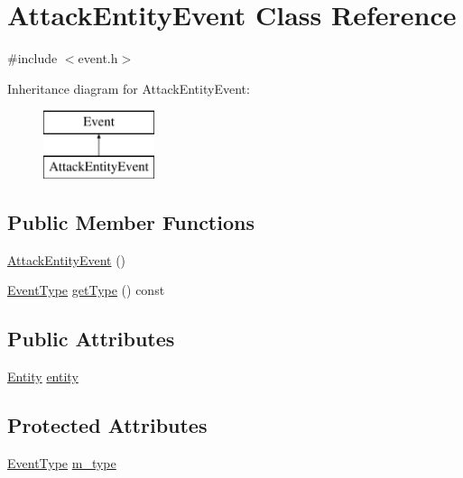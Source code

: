 \hypertarget{classAttackEntityEvent}{\section{Attack\-Entity\-Event Class Reference}
\label{classAttackEntityEvent}
}


{\ttfamily \#include $<$event.\-h$>$}

Inheritance diagram for Attack\-Entity\-Event\-:\begin{figure}[H]
\begin{center}
\leavevmode
\includegraphics[height=2.000000cm]{classAttackEntityEvent}
\end{center}
\end{figure}
\subsection*{Public Member Functions}
\begin{DoxyCompactItemize}
\item 
\hyperlink{classAttackEntityEvent_a32db1508238dc3f01f18c07531804757}{Attack\-Entity\-Event} ()
\item 
\hyperlink{event_8h_a2628ea8d12e8b2563c32f05dc7fff6fa}{Event\-Type} \hyperlink{classEvent_ab0c2e30730d5859851f3126258c0126e}{get\-Type} () const 
\end{DoxyCompactItemize}
\subsection*{Public Attributes}
\begin{DoxyCompactItemize}
\item 
\hyperlink{classEntity}{Entity} \hyperlink{classAttackEntityEvent_a1dae8f2e2e9224c2bf5f19b665d06a8b}{entity}
\end{DoxyCompactItemize}
\subsection*{Protected Attributes}
\begin{DoxyCompactItemize}
\item 
\hyperlink{event_8h_a2628ea8d12e8b2563c32f05dc7fff6fa}{Event\-Type} \hyperlink{classEvent_a38264e3fb229dc64123dff1d5a7dcf9e}{m\-\_\-type}
\end{DoxyCompactItemize}


